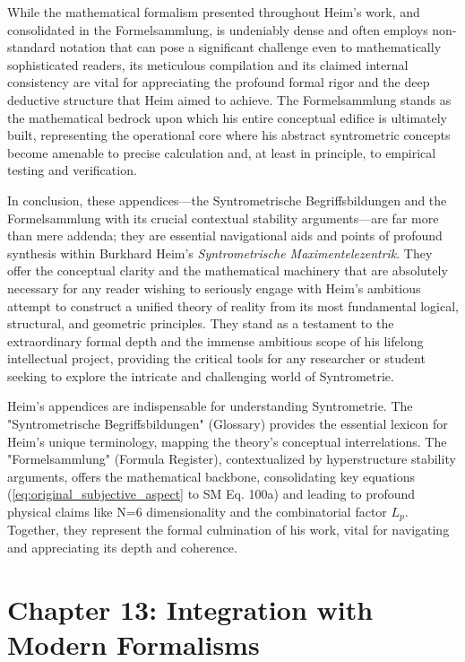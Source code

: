 \documentclass[12pt]{article}
\begin{document}
While the mathematical formalism presented throughout Heim's work, and consolidated in the Formelsammlung, is undeniably dense and often employs non-standard notation that can pose a significant challenge even to mathematically sophisticated readers, its meticulous compilation and its claimed internal consistency are vital for appreciating the profound formal rigor and the deep deductive structure that Heim aimed to achieve. The Formelsammlung stands as the mathematical bedrock upon which his entire conceptual edifice is ultimately built, representing the operational core where his abstract syntrometric concepts become amenable to precise calculation and, at least in principle, to empirical testing and verification.

In conclusion, these appendices—the Syntrometrische Begriffsbildungen and the Formelsammlung with its crucial contextual stability arguments—are far more than mere addenda; they are essential navigational aids and points of profound synthesis within Burkhard Heim's \textit{Syntrometrische Maximentelezentrik}. They offer the conceptual clarity and the mathematical machinery that are absolutely necessary for any reader wishing to seriously engage with Heim's ambitious attempt to construct a unified theory of reality from its most fundamental logical, structural, and geometric principles. They stand as a testament to the extraordinary formal depth and the immense ambitious scope of his lifelong intellectual project, providing the critical tools for any researcher or student seeking to explore the intricate and challenging world of Syntrometrie.

Heim's appendices are indispensable for understanding Syntrometrie. The "Syntrometrische Begriffsbildungen" (Glossary) provides the essential lexicon for Heim's unique terminology, mapping the theory's conceptual interrelations. The "Formelsammlung" (Formula Register), contextualized by hyperstructure stability arguments, offers the mathematical backbone, consolidating key equations (\eqref{eq:original_subjective_aspect} to SM Eq. 100a) and leading to profound physical claims like N=6 dimensionality and the combinatorial factor \(L_p\). Together, they represent the formal culmination of his work, vital for navigating and appreciating its depth and coherence.

\clearpage 

\section{Chapter 13: Integration with Modern Formalisms}
\label{sec:chapter13}
\end{document}
